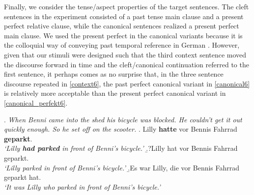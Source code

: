 \documentclass{salt}
\begin{document}
Finally, we consider the tense/aspect properties of the target sentences. The cleft sentences in the experiment consisted of a past tense main clause and a present perfect relative clause, while the canonical sentences realized a present perfect main clause. We used the present perfect in the canonical variants because it is the colloquial way of conveying past temporal reference in German \citep{van_der_klis_et_al_2017}. However, given that our stimuli were designed such that the third context sentence moved the discourse forward in time and the cleft/canonical continuation referred to the first sentence, it perhaps comes as no surprise that, in the three sentence discourse repeated in \ref{context6}, the past perfect canonical variant in \ref{canonical6} is relatively more acceptable than the present perfect canonical variant in \ref{canonical_perfekt6}.\vspace{-0.5ex}
 
 \ex.\label{context6} \textit{When Benni came into the shed his bicycle was blocked. He couldn't get it out quickly enough. So he set off on the scooter.}\label{context5}
 \a.\label{canonical6} Lilly \textbf{hatte} vor Bennis Fahrrad \textbf{geparkt}.\\
\textit{`Lilly \textbf{had parked} in front of Benni's bicycle.'}
 \b.?\label{canonical_perfekt6}Lilly hat vor Bennis Fahrrad geparkt.\\
\textit{`Lilly parked in front of Benni's bicycle.'}
\b.\label{cleft6}Es war Lilly, die vor Bennis Fahrrad geparkt hat.\\
\textit{`It was Lilly who parked in front of Benni's bicycle.'}
\end{document}
